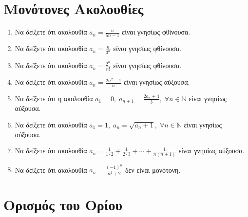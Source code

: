 \section{Μονότονες Ακολουθίες}

\begin{enumerate}
    \item Να δείξετε ότι ακολουθία $ a_{n} = \frac{n}{5n-1} $ είναι 
        γνησίως φθίνουσα.
    \item Να δείξετε ότι ακολουθία $ a_{n} = \frac{n}{3^{n}} $ είναι 
        γνησίως φθίνουσα.
    \item Να δείξετε ότι ακολουθία $ a_{n} = \frac{2^{n}}{n!} $ είναι 
        γνησίως φθίνουσα.
    \item Να δείξετε ότι ακολουθία $ a_{n} = \frac{2n^{2}-1}{n} $ είναι γνησίως 
        αύξουσα.
    \item Να δείξετε ότι η ακολουθία $ a_{1}=0, \; a_{n+1}= 
        \frac{2 a_{n}+4}{3}, \; \forall n \in \mathbb{N} $ είναι γνησίως αύξουσα.
    \item Να δείξετε ότι ακολουθία $ a_{1}=1, \; a_{n} = \sqrt{a_{n}+1}, \; 
        \forall n \in \mathbb{N}$ είναι γνησίως αύξουσα.
    \item Να δείξετε ότι ακολουθία $ a_{n} = \frac{1}{1\cdot 2} + \frac{1}{2\cdot 3} 
        + \cdots + \frac{1}{n(n+1)} $ είναι γνησίως αύξουσα.
    \item Να δείξετε ότι ακολουθία $ a_{n} =  \frac{(-1)^{n}}{n^{2}+2} $ 
        δεν είναι μονότονη.
\end{enumerate}

\section{Ορισμός του Ορίου}

